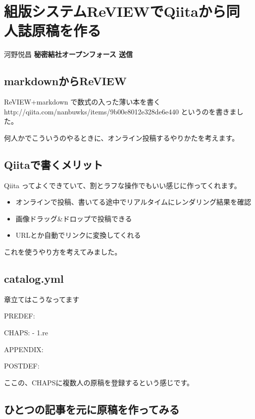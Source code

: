 \chapter{組版システムReVIEWでQiitaから同人誌原稿を作る}
\label{chap:qiita2review}
 \begin{center} 
河野悦昌  \textbf{秘密結社オープンフォース 送信}

 \end{center} 
\section{markdownからReVIEW}
\label{sec:5-1}

ReVIEW+markdown で数式の入った薄い本を書く
http://qiita.com/nanbuwks/items/9b00e8012e328de6e440
というのを書きました。

何人かでこういうのやるときに、オンライン投稿するやりかたを考えます。

\section{Qiitaで書くメリット}
\label{sec:5-2}

Qiita ってよくできていて、割とラフな操作でもいい感じに作ってくれます。

\begin{itemize}
\item オンラインで投稿、書いてる途中でリアルタイムにレンダリング結果を確認
\item 画像ドラッグ\&ドロップで投稿できる
\item URLとか自動でリンクに変換してくれる
\end{itemize}

これを使うやり方を考えてみました。

\section{catalog.yml}
\label{sec:5-3}

章立てはこうなってます

\begin{reviewemlist}
PREDEF:

CHAPS:
  {-} 1.re

APPENDIX:

POSTDEF:
\end{reviewemlist}

ここの、CHAPSに複数人の原稿を登録するという感じです。

\section{ひとつの記事を元に原稿を作ってみる}
\label{sec:5-4}

